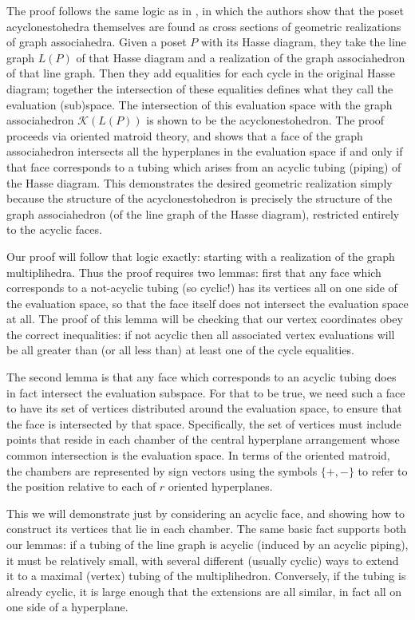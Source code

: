\documentclass{article}
\begin{document}
The proof follows the same logic as in \cite{mppfull}, in which the authors show that the poset acyclonestohedra themselves  are found as cross sections of geometric realizations of graph associahedra. Given a poset $P$ with its Hasse diagram, they take the line graph $L(P)$ of that Hasse diagram and a realization of the graph associahedron of that line graph. Then they add equalities for each cycle in the original Hasse diagram; together the intersection of these equalities defines what they call the evaluation (sub)space. The intersection of this evaluation space with the graph associahedron $\mathcal{K}(L(P))$ is shown to be the acyclonestohedron. The proof proceeds via oriented matroid theory, and shows that a face of the graph associahedron intersects all the hyperplanes in the evaluation space if and only if that face corresponds to a tubing which arises from an acyclic tubing (piping) of the Hasse diagram. This demonstrates the desired geometric realization simply because the structure of the acyclonestohedron is precisely the structure of the graph associahedron (of the line graph of the Hasse diagram), restricted entirely to the acyclic faces.

Our proof will follow that logic exactly: starting with a realization of the graph multiplihedra. Thus the proof requires two lemmas: first that any face which corresponds to a not-acyclic tubing (so cyclic!) has its vertices all on one side of the evaluation space, so that the face itself does not intersect the evaluation space at all. The proof of this lemma will be checking that our vertex coordinates obey the correct inequalities: if not acyclic then all associated vertex evaluations will be all greater than (or all less than) at least one of the cycle equalities.

The second lemma is that any face which corresponds to an acyclic tubing does in fact intersect the evaluation subspace. For that to be true, we need such a face to have its set of vertices distributed around the evaluation space, to ensure that the face is intersected by that space. 
Specifically, the set of vertices must include points that reside in each chamber of the central hyperplane arrangement whose common intersection is the evaluation space. In terms of the oriented matroid, the chambers are represented by sign vectors using the symbols $\{+,-\}$ to refer to the position relative to each of $r$ oriented hyperplanes.

This we will demonstrate just by considering an acyclic face, and showing how to construct its vertices that lie in each chamber.
The same basic fact supports both our lemmas: if a tubing of the line graph is acyclic (induced by an acyclic piping), it must be relatively small, with several different (usually cyclic) ways to extend it to a maximal (vertex) tubing of the multiplihedron. Conversely, if the tubing is already cyclic, it is large enough that the extensions are all similar, in fact all on one side of a hyperplane. 
\end{document}
